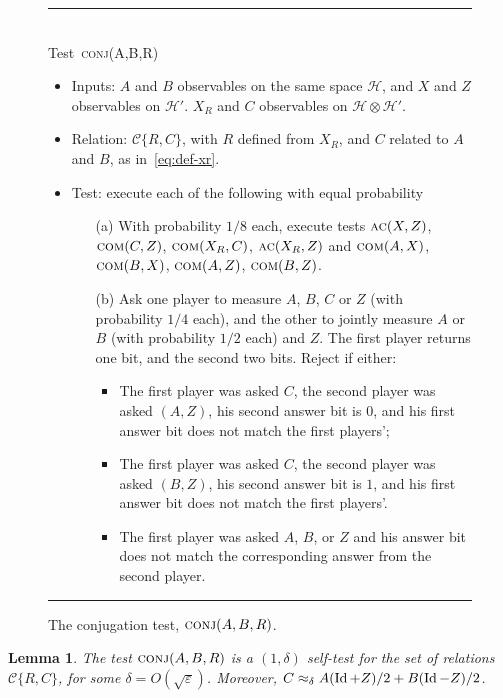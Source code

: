 \documentclass[11pt]{article}
\newtheorem{lemma}[theorem]{Lemma}
\theoremstyle{remark}
\theoremstyle{definition}
\newcommand{\Id}{\ensuremath{\mathop{\rm Id}\nolimits}}
\newcommand{\mH}{\mathcal{H}}
\newcommand{\eps}{\varepsilon}
\newcommand{\conj}{\textsc{conj}}
\newcommand{\comt}{\textsc{com}}
\newcommand{\act}{\textsc{ac}}
\begin{document}
\begin{figure}[H]
\rule[1ex]{16.5cm}{0.5pt}\\
Test~\conj(A,B,R) 
\begin{itemize}
    \item Inputs: $A$ and $B$ observables on the same space $\mH$, and $X$ and $Z$ observables on $\mH'$. $X_R$ and $C$ observables on $\mH\otimes \mH'$.
    \item Relation:  $\mathcal{C}\{R,C\} $, with $R$ defined from $X_R$, and $C$ related to $A$ and $B$, as in~\eqref{eq:def-xr}. 
    \item Test: execute each of the following with equal probability
		\begin{enumerate}
\item[(a)] With probability $1/8$ each, execute tests $\act(X,Z)$,  $\comt(C,Z)$, $\comt(X_R,C)$,   $\act(X_R,Z)$ and $\comt(A,X)$, $\comt(B,X)$, $\comt(A,Z)$, $\comt(B,Z)$. 
\item[(b)] Ask one player to measure $A$, $B$, $C$ or $Z$ (with probability $1/4$ each), and the other to jointly measure $A$ or $B$ (with probability $1/2$ each) and $Z$. The first player returns one bit, and the second two bits. Reject if either:
\begin{itemize}
\item The first player was asked $C$, the second player was asked $(A,Z)$, his second answer bit is $0$, and his first answer bit does not match the first players';
\item The first player was asked $C$, the second player was asked $(B,Z)$, his second answer bit is $1$, and his first answer bit does not match the first players'.
\item The first player was asked $A$, $B$, or $Z$ and his answer bit does not match the corresponding answer from the second player.
\end{itemize}
\end{enumerate}
\end{itemize}
\rule[2ex]{16.5cm}{0.5pt}\vspace{-1cm}
\caption{The conjugation test, $\conj(A,B,R)$.}
\label{fig:conjugation-test-1}
\end{figure}

\begin{lemma}\label{lem:conj}
The test $\conj(A,B,R)$ is a $(1,\delta)$ self-test for the set of relations $\mathcal{C}\{R,C\}$, for some $\delta = O(\sqrt{\eps})$. Moreover, $C \approx_{\delta} A (\Id+Z)/2 + B(\Id-Z)/2$. 
\end{lemma}
\end{document}
